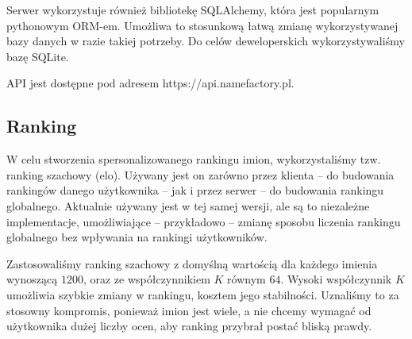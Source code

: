 \documentclass[12pt,a4paper]{article}
\begin{document}
Serwer wykorzystuje również bibliotekę SQLAlchemy, która jest popularnym pythonowym ORM-em.
Umożliwa to stosunkową łatwą zmianę wykorzystywanej bazy danych w razie takiej potrzeby.
Do celów deweloperskich wykorzystywaliśmy bazę SQLite.

API jest dostępne pod adresem https://api.namefactory.pl.

\subsection{Ranking}
W celu stworzenia spersonalizowanego rankingu imion, wykorzystaliśmy tzw. ranking szachowy (elo).
Używany jest on zarówno przez klienta -- do budowania rankingów danego użytkownika -- jak i przez serwer -- do budowania rankingu globalnego.
Aktualnie używany jest w tej samej wersji, ale są to niezależne implementacje, umożliwiające -- przykładowo -- zmianę sposobu liczenia rankingu globalnego bez wpływania na rankingi użytkowników.

Zastosowaliśmy ranking szachowy z domyślną wartością dla każdego imienia wynoszącą \(1200\), oraz ze współczynnikiem \(K\) równym \(64\).
Wysoki współczynnik \(K\) umożliwia szybkie zmiany w rankingu, kosztem jego stabilności.
Uznaliśmy to za stosowny kompromis, ponieważ imion jest wiele, a nie chcemy wymagać od użytkownika dużej liczby ocen, aby ranking przybrał postać bliską prawdy.
\end{document}
